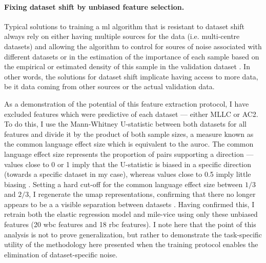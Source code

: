 \paragraph{Fixing dataset shift by unbiased feature selection.} Typical solutions to training a \ac{ml} algorithm that is resistant to dataset shift always rely on either having multiple sources for the data (i.e. multi-centre datasets) and allowing the algorithm to control for soures of noise associated with different datasets or in the estimation of the importance of each sample based on the empirical or estimated density of this sample in the validation dataset \cite{Y2019-vc}. In other words, the solutions for dataset shift implicate having access to more data, be it data coming from other sources or the actual validation data.

As a demonstration of the potential of this feature extraction protocol, I have excluded features which were predictive of each dataset --- either MLLC or AC2. To do this, I use the Mann-Whitney U-statistic between both datasets for all features and divide it by the product of both sample sizes, a measure known as the common language effect size which is equivalent to the \ac{auroc}. The common language effect size represents the proportion of pairs supporting a direction --- values close to 0 or 1 imply that the U-statistic is biased in a specific direction (towards a specific dataset in my case), whereas values close to 0.5 imply little biasing \cite{Kerby2014-fy}. Setting a hard cut-off for the common language effect size between $1/3$ and $2/3$, I regenerate the \ac{umap} representations, confirming that there no longer appears to be a a visible separation between datasets . Having confirmed this, I retrain both the elastic regression model and \ac{mile-vice} using only these unbiased features (20 \ac{wbc} features and 18 \ac{rbc} features). I note here that the point of this analysis is not to prove generalization, but rather to demonstrate the task-specific utility of the methodology here presented when the training protocol enables the elimination of dataset-specific noise.

\begin{figure}[!ht]
    \label{fig:u-map-unbiased}
\end{figure}

